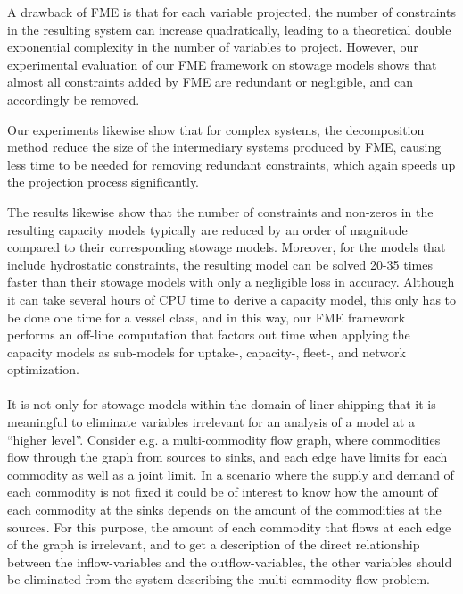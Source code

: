 A drawback of FME is that for each variable projected, the number of constraints in the resulting system can increase quadratically, leading to a theoretical double exponential complexity in the number of variables to project. However, our experimental evaluation of our FME framework on stowage models shows that almost all constraints added by FME are redundant or negligible, and can accordingly be removed. 

Our experiments likewise show that for complex systems, the decomposition method reduce the size of the intermediary systems produced by FME, causing less time to be needed for removing redundant constraints, which again speeds up the projection process significantly. %

The results likewise show that the number of constraints and non-zeros in the resulting capacity models typically are reduced by an order of magnitude compared to their corresponding stowage models. Moreover, for the models that include hydrostatic constraints, the resulting model can be solved 20-35 times faster than their stowage models with only a negligible loss in accuracy. Although it can take several hours of CPU time to derive a capacity model, this only has to be done one time for a vessel class, and in this way, our FME framework performs an off-line computation that factors out time when applying the capacity models as sub-models for uptake-, capacity-, fleet-, and network optimization.
\\
\\
It is not only for stowage models within the domain of liner shipping that it is meaningful to eliminate variables irrelevant for an analysis of a model at a ``higher level''. Consider e.g. a multi-commodity flow graph, where commodities flow through the graph from sources to sinks, and each edge have limits for each commodity as well as a joint limit. In a scenario where the supply and demand of each commodity is not fixed it could be of interest to know how the amount of each commodity at the sinks depends on the amount of the commodities at the sources. For this purpose, the amount of each commodity that flows at each edge of the graph is irrelevant, and to get a description of the direct relationship between the inflow-variables and the outflow-variables, the other variables should be eliminated from the system describing the multi-commodity flow problem.


